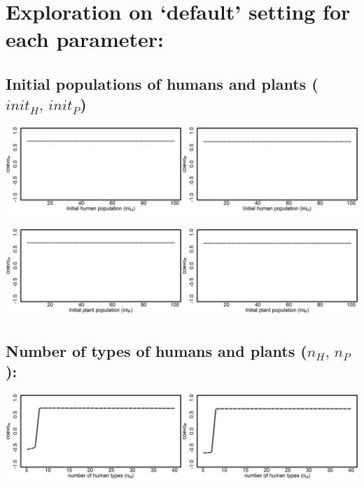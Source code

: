 \documentclass[
]{book}
\begin{document}
\newpage

\hypertarget{exploration-on-default-setting-for-each-parameter}{%
\section{Exploration on `default' setting for each parameter:}\label{exploration-on-default-setting-for-each-parameter}}

\hypertarget{initial-populations-of-humans-and-plants-init_hinit_p}{%
\subsection{\texorpdfstring{Initial populations of humans and plants (\(init_{H},\,init_{P}\))}{Initial populations of humans and plants (init\_\{H\},\textbackslash,init\_\{P\})}}\label{initial-populations-of-humans-and-plants-init_hinit_p}}

\includegraphics[width=1\linewidth]{plots/2_onePar-init.H_bifplot-pair}

\includegraphics[width=1\linewidth]{plots/2_onePar-init.P_bifplot-pair}

\hypertarget{number-of-types-of-humans-and-plants-n_hn_p}{%
\subsection{\texorpdfstring{Number of types of humans and plants (\(n_{H},\,n_{P}\)):}{Number of types of humans and plants (n\_\{H\},\textbackslash,n\_\{P\}):}}\label{number-of-types-of-humans-and-plants-n_hn_p}}

\includegraphics[width=1\linewidth]{plots/2_onePar-n.H_bifplot-pair}
\end{document}
